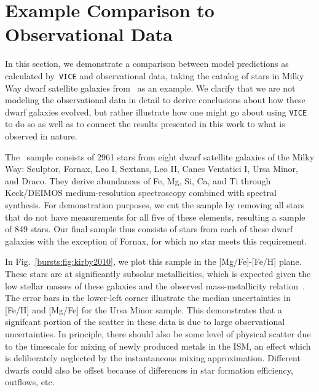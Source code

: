 
\chapter{Example Comparison to Observational Data}
\label{bursts:appendix:obs_compare}
In this section, we demonstrate a comparison between model predictions as 
calculated by~\texttt{VICE} and observational data, taking the catalog of 
stars in Milky Way dwarf satellite galaxies from~\citet{Kirby2010} as an 
example. We clarify that we are not modeling the observational data in detail 
to derive conclusions about how these dwarf galaxies evolved, but rather 
illustrate how one might go about using \texttt{VICE} to do so as well as to 
connect the results presented in this work to what is observed in nature. 
\par 
The~\citet{Kirby2010} sample consists of 2961 stars from eight dwarf satellite 
galaxies of the Milky Way: Sculptor, Fornax, Leo I, Sextans, Leo II, Canes 
Ventatici I, Ursa Minor, and Draco. They derive abundances of Fe, Mg, Si, Ca, 
and Ti through Keck/DEIMOS medium-resolution spectroscopy combined with 
spectral synthesis. For demonstration purposes, we cut the sample by removing 
all stars that do not have measurements for all five of these elements, 
resulting a sample of 849 stars. Our final sample thus consists of stars from 
each of these dwarf galaxies with the exception of Fornax, for which no star 
meets this requirement. 
\par 
In Fig.~\ref{bursts:fig:kirby2010}, we plot this sample in the [Mg/Fe]-[Fe/H] plane. 
These stars are at significantly subsolar metallicities, which is expected 
given the low stellar masses of these galaxies and the observed 
mass-metallicity relation~\citep[e.g.][]{Andrews2013}. The error bars in the 
lower-left corner illustrate the median uncertainties in [Fe/H] and [Mg/Fe] 
for the Ursa Minor sample. This demonstrates that a signifcant portion of the 
scatter in these data is due to large observational uncertainties. In 
principle, there should also be
some level of physical scatter 
due to the timescale for mixing of newly produced metals in the ISM, an 
effect which is deliberately neglected by the instantaneous mixing 
approximation. 
Different dwarfs could also be offset because of differences in 
star formation efficiency, outflows, etc.

